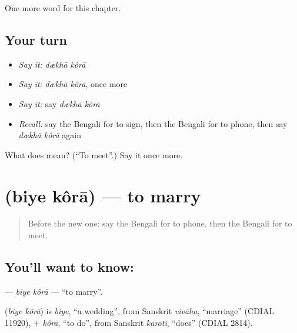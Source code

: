 \begin{grammarlens}[title={What you've built}]
One more word for this chapter.
\end{grammarlens}

\subsection*{Your turn}
\begin{itemize}
\raggedright
  \item \emph{Say it:} \emph{dækhā kôrā}
  \item \emph{Say it:} \emph{dækhā kôrā}, once more
  \item \emph{Say it:} say \emph{dækhā kôrā}
  \item \emph{Recall:} say the Bengali for to sign, then the Bengali for to phone, then say \emph{dækhā kôrā} again
\end{itemize}

\begin{tcolorbox}[breakable,colback=teal!4,colframe=teal!35!black,title={Before you move on}]
What does   mean? (\textquotedblleft{}To meet\textquotedblright{}.) Say it once more.
\end{tcolorbox}
\section[\texorpdfstring{\bn{বিয়ে} \bn{করা} (biye kôrā)}{বিয়ে করা (biye kôrā)}]{  (biye kôrā) — to marry}

\label{lesson:BN-C210-biye-kora}



\begin{quote}
Before the new one: say the Bengali for to phone, then the Bengali for to meet.
\end{quote}

\subsection*{You'll want to know:  }
\textbf{ } — \emph{biye kôrā} — \textquotedblleft{}to marry\textquotedblright{}.

\begin{cousinweb}
\textbf{ } (\emph{biye kôrā}) is \emph{biye}, \textquotedblleft{}a wedding\textquotedblright{}, from Sanskrit \emph{vivāha}, \textquotedblleft{}marriage\textquotedblright{} (CDIAL 11920), + \emph{kôrā}, \textquotedblleft{}to do\textquotedblright{}, from Sanskrit \emph{karoti}, \textquotedblleft{}does\textquotedblright{} (CDIAL 2814).
\end{cousinweb}

